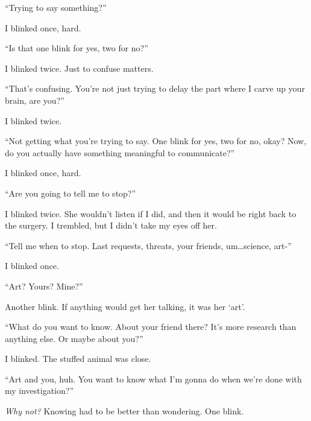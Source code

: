 ``Trying to say something?''



I blinked once, hard.



``Is that one blink for yes, two for no?''



I blinked twice.  Just to confuse matters.



``That's confusing.  You're not just trying to delay the part where I carve up your brain, are you?''



I blinked twice.



``Not getting what you're trying to say.  One blink for yes, two for no, okay?  Now, do you actually have something meaningful to communicate?''



I blinked once, hard.



``Are you going to tell me to stop?''



I blinked twice.  She wouldn't listen if I did, and then it would be right back to the surgery.  I trembled, but I didn't take my eyes off her.



``Tell me when to stop.  Last requests, threats, your friends, um\ldots science, art-''



I blinked once.



``Art?  Yours?  Mine?''



Another blink.  If anything would get her talking, it was her `art'.



``What do you want to know.  About your friend there?  It's more research than anything else.  Or maybe about you?''



I blinked.  The stuffed animal was close.



``Art and you, huh.  You want to know what I'm gonna do when we're done with my investigation?''



\emph{Why not?}  Knowing had to be better than wondering.  One blink.



